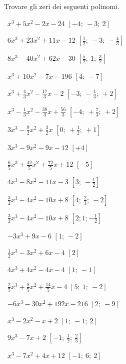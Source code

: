 
\begin{esercizio}[\Ast]
 \label{ese:5.1}
Trovare gli zeri dei seguenti polinomi.
\begin{multicols}{2}
 \begin{enumeratea}
 \item~$x^3+5x^2-2x-24$ \hfill $\left[-4;~-3;~2\right]$
 \item~$6x^3+23x^2+11x-12$ \hfill $\left[\frac 1 2;~-3;~-\frac 4 3\right]$
 \item~$8x^3-40x^2+62x-30$ \hfill $\left[\frac 5 2;~1;~\frac 3 2\right]$
 \item~$x^3+10x^2-7x-196$ \hfill $\left[4;~-7\right]$
 \item~$x^3+\frac 4 3x^2-\frac{17} 3x-2$ 
  \hfill $\left[-3;~-\frac 1 3;~+2\right]$
 \item~$x^3-\frac 1 3x^2-\frac{38} 3x+\frac{56} 3$ 
  \hfill $\left[-4;~+\frac 7 3;~+2\right]$
 \item~$3x^3-\frac 9 2x^2+\frac 3 2x$ \hfill $\left[0;~+\frac 1 2;~+1\right]$
 \item~$3x^3-9x^2-9x-12$ \hfill $\left[+4\right]$
 \item~$\frac 6 5x^3+\frac{42} 5x^2+\frac{72} 5x+12$ \hfill $\left[-5\right]$
 \item~$4x^3-8x^2-11x-3$ \hfill $\left[3;~-\frac 1 2\right]$
 \item~$\frac 3 2x^3-4x^2-10x+8$ \hfill $\left[4;~\frac 2 3;~-2\right]$
 \item~$\frac 3 2x^3-4x^2-10x+8$ \hfill $\left[2;1;-\frac 1 2\right]$
 \item~$-3x^3+9x-6$ \hfill $\left[1;~-2\right]$
 \item~$\frac 1 2x^3-3x^2+6x-4$ \hfill $\left[2\right]$
 \item~$4x^3+4x^2-4x-4$ \hfill $\left[1;~-1\right]$
 \item~$\frac 2 5x^3+\frac 8 5x^2+\frac{14} 5x-4$ \hfill $\left[5;~1;~-2\right]$
 \item~$-6x^3-30x^2+192x-216$ \hfill $\left[2;~-9\right]$
 \item~$x^3-2x^2-x+2$ \hfill $\left[1;~-1;~2\right]$
 \item~$9x^3-7x+2$ \hfill $\left[-1;~\frac 1 2;~\frac 2 3\right]$
 \item~$x^3-7x^2+4x+12$ \hfill $\left[-1;~6;~2\right]$

\end{enumeratea}
\end{multicols}
\end{esercizio}
